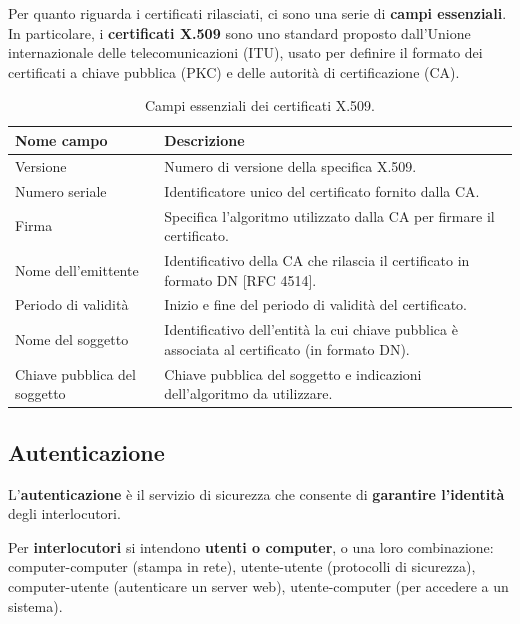 \documentclass[a4paper]{article}
\begin{document}
	\noindent
	Per quanto riguarda i certificati rilasciati, ci sono una serie di \textbf{campi essenziali}. In particolare, i \textcolor{Red3}{\textbf{certificati X.509}} sono uno standard proposto dall'Unione internazionale delle telecomunicazioni (ITU), usato per definire il formato dei certificati a chiave pubblica (PKC) e delle autorità di certificazione (CA).
	\begin{table}[!htp]
		\centering
		\begin{tabular}{@{} l p{18em} @{}}
			\toprule
			Nome campo 						& Descrizione \\
			\midrule
			Versione						& Numero di versione della specifica X.509. \\ [0.5em]
			Numero seriale					& Identificatore unico del certificato fornito dalla CA. \\ [0.5em]
			Firma							& Specifica l'algoritmo utilizzato dalla CA per firmare il certificato. \\ [0.5em]
			Nome dell'emittente				& Identificativo della CA che rilascia il certificato in formato DN [RFC 4514]. \\ [0.5em]
			Periodo di validità				& Inizio e fine del periodo di validità del certificato. \\ [0.5em]
			Nome del soggetto				& Identificativo dell'entità la cui chiave pubblica è associata al certificato (in formato DN). \\ [0.5em]
			Chiave pubblica del soggetto	& Chiave pubblica del soggetto e indicazioni dell'algoritmo da utilizzare. \\
			\bottomrule
		\end{tabular}
		\caption{Campi essenziali dei certificati X.509.}
	\end{table}\newpage
	
	\subsection{Autenticazione}
	
	L'\textcolor{Red3}{\textbf{autenticazione}} è il servizio di sicurezza che consente di \textbf{garantire l'identità} degli interlocutori.\newline
	
	\noindent
	Per \textbf{interlocutori} si intendono \textbf{utenti o computer}, o una loro combinazione: computer-computer (stampa in rete), utente-utente (protocolli di sicurezza), computer-utente (autenticare un server web), utente-computer (per accedere a un sistema).
	
\end{document}
